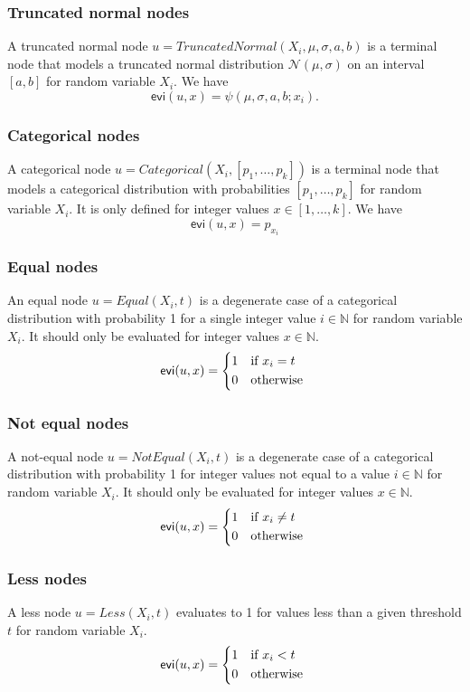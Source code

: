 \documentclass{article}
\newcommand{\func}[1]{\ensuremath{\textsf{#1}}} %
\newcommand{\obj}[1]{\ensuremath{\textit{#1}}} %
\begin{document}
\subsubsection*{Truncated normal nodes}
A truncated normal node $u = \obj{TruncatedNormal}(X_i, \mu, \sigma, a, b)$ is a terminal node that models a truncated normal distribution $\mathcal{N}(\mu,\sigma)$ on an interval $[a, b]$ for random variable $X_i$.
We have
\[
\func{evi}(u, x) = \psi(\mu,\sigma,a,b;x_i).
\]

\subsubsection*{Categorical nodes}
A categorical node 
$u = \obj{Categorical}(X_i, [p_1, \ldots, p_k])$ 
is a terminal node that models a categorical distribution with probabilities $[p_1, \ldots, p_k]$ for random variable $X_i$.
It is only defined for integer values $x \in [1, \ldots, k]$. We have
\[
\func{evi}(u, x) = p_{x_i}
\]

\subsubsection*{Equal nodes}
An equal node $u = \obj{Equal}(X_i, t)$ is a degenerate case of a categorical distribution with probability 1 for a single integer value $i \in \mathbb{N}$ for random variable $X_i$. It should only be evaluated for integer values $x \in \mathbb{N}$.
\[
\func{evi}(u, x) =
\begin{cases*}
1 & if $x_i = t$ \\
0 & otherwise 
\end{cases*}
\]

\subsubsection*{Not equal nodes}
A not-equal node $u = \obj{NotEqual}(X_i, t)$ is a degenerate case of a categorical distribution with probability 1 for integer values not equal to a value $i \in \mathbb{N}$ for random variable $X_i$. It should only be evaluated for integer values $x \in \mathbb{N}$.
\[
\func{evi}(u, x) =
\begin{cases*}
1 & if $x_i \neq t$ \\
0 & otherwise 
\end{cases*}
\]

\subsubsection*{Less nodes}
A less node $u = \obj{Less}(X_i, t)$ evaluates to 1 for values less than a given threshold $t$ for random variable $X_i$.
\[
\func{evi}(u, x) =
\begin{cases*}
1 & if $x_i < t$ \\
0 & otherwise 
\end{cases*}
\]
\end{document}
